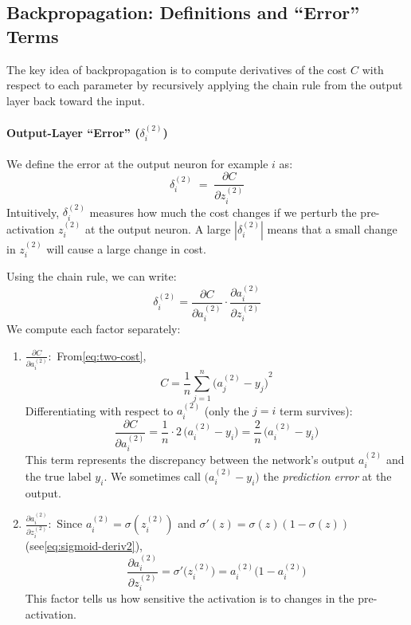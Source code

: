 \documentclass{article}
\begin{document}
\subsection{Backpropagation: Definitions and ``Error'' Terms}\label{sec:two-neuron-backprop-definitions}

\noindent The key idea of backpropagation is to compute derivatives of the cost \(C\) with respect to each parameter by recursively applying the chain rule from the output layer back toward the input.

\paragraph{Output-Layer ``Error'' (\(\delta_i^{(2)}\))\\}
We define the error at the output neuron for example \(i\) as:
\[
    \delta_i^{(2)} \;=\; \frac{\partial C}{\partial z_i^{(2)}}
\]
Intuitively, \(\delta_i^{(2)}\) measures how much the cost changes if we perturb the pre-activation \(z_i^{(2)}\) at the output neuron.  A large \(|\delta_i^{(2)}|\) means that a small change in \(z_i^{(2)}\) will cause a large change in cost.

Using the chain rule, we can write:
\[
    \delta_i^{(2)} = \frac{\partial C}{\partial a_i^{(2)}} \cdot \frac{\partial a_i^{(2)}}{\partial z_i^{(2)}}
\]
We compute each factor separately:

\begin{enumerate}
    \item \(\displaystyle {\frac{\partial C}{\partial a_i^{(2)}}:}\)  From\eqref{eq:two-cost},
    \[
        C = \frac{1}{n} \sum_{j=1}^n {\bigl(a_j^{(2)} - y_j\bigr)}^2
    \]
    Differentiating with respect to \(a_i^{(2)}\) (only the \(j=i\) term survives):
    \[
        \frac{\partial C}{\partial a_i^{(2)}}
        = \frac{1}{n} \cdot 2\,{\bigl(a_i^{(2)} - y_i\bigr)}
        = \frac{2}{n}\,{\bigl(a_i^{(2)} - y_i\bigr)}
    \]
    This term represents the discrepancy between the network's output \(a_i^{(2)}\) and the true label \(y_i\).  We sometimes call 
    \(\bigl(a_i^{(2)} - y_i\bigr)\) the 
    \emph{prediction error} at the output.

    \item \(\displaystyle {\frac{\partial a_i^{(2)}}{\partial z_i^{(2)}}:}\)  Since \(a_i^{(2)} = \sigma(z_i^{(2)})\) and \(\sigma'(z) = \sigma(z)(1 - \sigma(z))\) (see\eqref{eq:sigmoid-deriv2}),
    \[
        \frac{\partial a_i^{(2)}}{\partial z_i^{(2)}}
        = \sigma'\bigl(z_i^{(2)}\bigr)
        = a_i^{(2)}\bigl(1 - a_i^{(2)}\bigr)
    \]
    This factor tells us how sensitive the activation is to changes in the pre-activation.
\end{enumerate}
\end{document}
